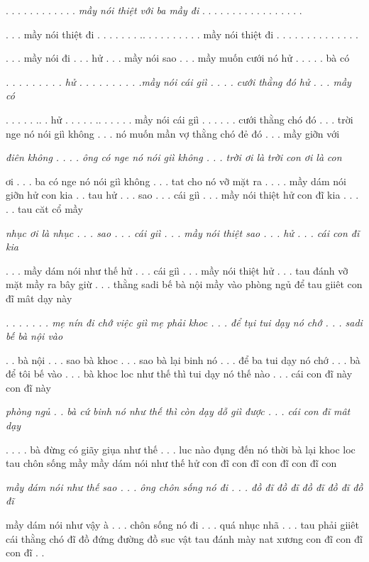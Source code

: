 \documentclass[../main.tex]{subfiles}
\begin{document}
\begin{multicols}{2}
\begin{blockquote}
. . . . . . . . . . . . \textit{mầy nói thiệt với ba mầy đi} . . . . . . . . . . . . . . . . .  
 
. . . mầy nói thiệt đi . . . . . . . .. . . . . . . . . . mầy nói thiệt đi . . . . . . . . . . . . . .  
 
. . . mầy nói đi . . . hử . . . mầy nói sao . . . mầy muốn cưới nó hử . . . . . bà có  
 
\textit{. . . . . . . . . hử . . . . . . . . . .mầy nói cái giì . . . . cưới thằng đó hử . . . mầy có}  
 
. . . . . .. . hử . . . . . .. . . . . . mầy nói cái giì . . . . . . cưới thằng chó đó . . . trời  
nge nó nói giì không . . . nó muốn mần vợ thằng chó đẻ đó . . . mầy giỡn với  
 
\textit{điên không . . . . ông có nge nó nói giì không . . . trời ơi là} \textit{trời con ơi là} \textit{con } 
 
ơi . . . ba có nge nó nói giì không . . . tat cho nó vỡ mặt ra . . . . mầy dám nói giỡn hử con kia . .  
tau hử . . . sao . . . cái giì . . . mầy nói thiệt hử con đĩ kia . . . . . tau căt cổ mầy  
 
\textit{nhục ơi là nhục . . . sao . . . cái giì . . . mầy nói thiệt sao . . . hử . . . cái con đĩ kia } 
 
. . . mầy dám nói như thế hử . . . cái giì . . . mầy nói thiệt hử . . . tau đánh vỡ mặt mầy ra bây giừ  
. . . thằng sadi bế bà nội mầy vào phòng ngủ để tau giiêt con đĩ mât dạy này  
 
\textit{. . . . . . . mẹ nín đi chớ việc giì mẹ phải khoc . . . để tụi tui dạy nó chớ . . . sadi bế bà nội vào } 
 
. . bà nội . . . sao bà khoc . . . sao bà lại binh nó . . . để ba tui dạy nó chớ . . . bà để tôi bế vào  
. . . bà khoc loc như thế thì tui dạy nó thế nào . . . cái con đĩ này con đĩ này  
 
\textit{phòng ngủ . . bà cứ binh nó như thế thì còn dạy dỗ giì được . . . cái con đĩ mât dạy } 
 
. . . . bà đừng có giãy giụa như thế . . . luc nào đụng đến nó thời bà lại khoc loc  
tau chôn sống mầy mầy dám nói như thế hử con đĩ con đĩ con đĩ con đĩ con  
 
\textit{mầy dám nói như thế sao . . . ông chôn sống nó đi . . . đồ đĩ đồ đĩ đồ đĩ đồ đĩ đồ đĩ}  
 
mầy dám nói như vậy à . . . chôn sống nó đi . . . quá nhục nhã . . . tau phải giiêt cái thằng chó  
đĩ đồ đứng đường đồ suc vật tau đánh mày nat xương con đĩ con đĩ con đĩ . .  
 

\end{blockquote}
\end{multicols}
\end{document}
